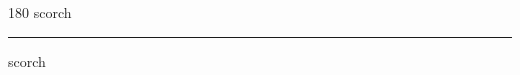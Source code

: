 
\begin{frame}
\begin{center}
\begin{turn}{180}
{\fontsize{2.5cm}{1em}\selectfont scorch}
\end{turn}
\vspace{1em}\par  
\hrule
\vspace{1em}\par  
{\fontsize{2.5cm}{1em}\selectfont scorch}
\end{center}
\end{frame}
